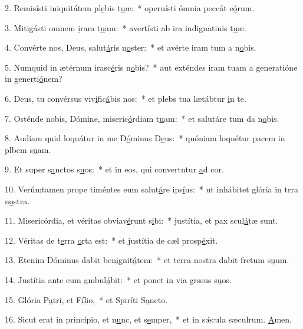 2. Remisísti iniquitátem pl\uline{e}bis t\uline{u}æ:~* operuísti ómnia peccát e\uline{ó}rum.\par 
3. Mitigásti omnem \uline{i}ram t\uline{u}am:~* avertísti ab ira indignatinis t\uline{u}æ.\par 
4. Convérte nos, Deus, salut\uline{á}ris n\uline{o}ster:~* et avérte iram tum a n\uline{o}bis.\par 
5. Numquid in ætérnum irasc\uline{é}ris n\uline{o}bis?~* aut exténdes iram tuam a generatióne in generti\uline{ó}nem?\par 
6. Deus, tu convérsus viv\uline{i}fic\uline{á}bis nos:~* et plebs tua lætábtur \uline{i}n te.\par 
7. Osténde nobis, Dómine, miseric\uline{ó}rdiam t\uline{u}am:~* et salutáre tum da n\uline{o}bis.\par 
8. Audiam quid loquátur in me D\uline{ó}minus D\uline{e}us:~* quóniam loquétur pacem in plbem s\uline{u}am.\par 
9. Et super s\uline{a}nctos s\uline{u}os:~* et in eos, qui convertntur \uline{a}d cor.\par 
10. Verúmtamen prope timéntes eum salut\uline{á}re ips\uline{í}us:~* ut inhábitet glória in trra n\uline{o}stra.\par 
11. Misericórdia, et véritas obviav\uline{é}runt s\uline{i}bi:~* justítia, et pax scul\uline{á}tæ sunt.\par 
12. Véritas de t\uline{e}rra \uline{o}rta est:~* et justítia de cæl prosp\uline{é}xit.\par 
13. Etenim Dóminus dabit ben\uline{i}gnit\uline{á}tem:~* et terra nostra dabit frctum s\uline{u}um.\par 
14. Justítia ante eum \uline{a}mbul\uline{á}bit:~* et ponet in via grssus s\uline{u}os.\par 
15. Glória P\uline{a}tri, et F\uline{í}lio,~* et Spiríti S\uline{a}ncto.\par 
16. Sicut erat in princípio, et n\uline{u}nc, et s\uline{e}mper,~* et in sǽcula sæculrum. \uline{A}men.\par 
